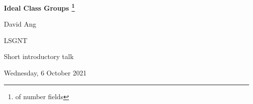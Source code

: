 \documentclass[10pt]{beamer}
\begin{document}
\begin{frame}

\begin{center}

\vspace{1in}

\textbf{\large Ideal Class Groups \footnote{of number fields}}

\vspace{0.5in}

{\normalsize David Ang}

\vspace{0.25in}

{\small LSGNT}

{\scriptsize Short introductory talk}

{\tiny Wednesday, 6 October 2021}

\end{center}

\end{frame}
\end{document}
